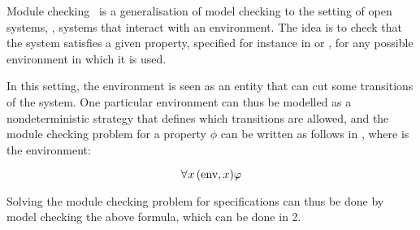 Module checking~\cite{kupferman2001module} is a generalisation of model checking to the setting
of open systems, \ie, systems that interact with an environment. The
idea is to check that the system satisfies a given property, specified
for instance in \LTL or \CTLs, for any possible environment in which
it is used.

In this setting, the environment is seen as an entity that can cut
some transitions of the system. One particular environment can thus be
modelled as a nondeterministic strategy that defines which transitions
are allowed, and the module checking problem for a property $\phi$ can
be written as follows in \SLref, where  is the environment:

\[\forall^{} x\, (\text{env},x) \varphi\]

Solving the module checking problem for \CTLs specifications can thus
be done by model checking the above \SLref formula, which can be done
in 2\EXPTIME.

